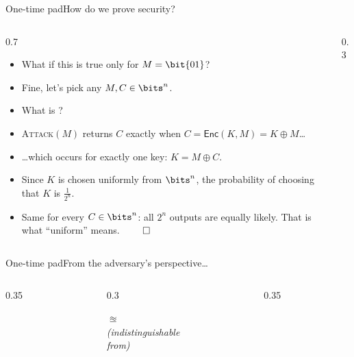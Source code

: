 \ifdefined\PRESENTATION\else\PassOptionsToClass{handout}{beamer}\fi\documentclass[aspectratio=169, lualatex]{beamer}
\begin{document}
\begin{frame}{One-time pad}{How do we prove security?}
	\begin{columns}[c]
		\begin{column}{0.7\textwidth}
			\begin{itemize}[<+->]
				\item What if this is true only for $M = \bit{01}$?
				\item Fine, let's pick any $M, C \in \bits^n$.
				\item What is ?
				\item \textsc{Attack}$(M)$ returns $C$ exactly when $C = \textsf{Enc}(K, M) = K \oplus M$\ldots
				\item \ldots which occurs for exactly one key: $K = M \oplus C$.
				\item Since $K$ is chosen uniformly from $\bits^n$, the probability of choosing that $K$ is $\frac{1}{2^n}$.
				\item Same for every $C \in \bits^n$: all $2^n$ outputs are equally likely. That is what ``uniform'' means. $\qed$
			\end{itemize}
		\end{column}
		\begin{column}{0.3\textwidth}
		\end{column}
	\end{columns}
\end{frame}

\begin{frame}{One-time pad}{From the adversary's perspective\ldots}
	\begin{columns}[c]
		\begin{column}{0.35\textwidth}
		\end{column}
		\begin{column}{0.3\textwidth}
			\begin{center}
				{\huge{$\approxeq$}} \\[1em]
				{\scriptsize\textit{(indistinguishable \\ from)}}
			\end{center}
		\end{column}
		\begin{column}{0.35\textwidth}
		\end{column}
	\end{columns}
\end{frame}
\end{document}
